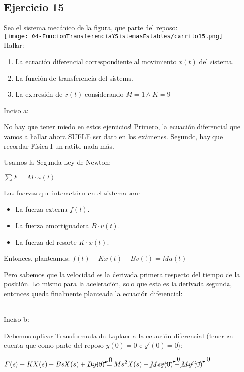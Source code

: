 \documentclass[11pt]{article}
\begin{document}
	\subsection{Ejercicio 15}
	Sea el sistema mecánico de la figura, que parte del reposo:\\
	\texttt{[image: 04-FuncionTransferenciaYSistemasEstables/carrito15.png]}\\
	Hallar:
	\begin{enumerate}[label=(\alph*)]
		\item La ecuación diferencial correspondiente al movimiento $x(t)$ del sistema.
		\item La función de transferencia del sistema.
		\item La expresión de $x(t)$ considerando $M=1 \wedge K=9$
	\end{enumerate}

	Inciso a:
	
	No hay que tener miedo en estos ejercicios! Primero, la ecuación diferencial que vamos a hallar ahora SUELE ser dato en los exámenes. Segundo, hay que recordar Física I un ratito nada más.
	
	Usamos la Segunda Ley de Newton:
	
	$\sum F=M\cdot a(t)$
	
	Las fuerzas que interactúan en el sistema son:
	\begin{itemize}
		\item La fuerza externa $f(t)$.
		\item La fuerza amortiguadora $B\cdot v(t)$.
		\item La fuerza del resorte $K \cdot x(t)$.
	\end{itemize}

	Entonces, planteamos:
	$f(t)-Kx(t)-Bv(t)=Ma(t)$
	
	Pero sabemos que la velocidad es la derivada primera respecto del tiempo de la posición. Lo mismo para la aceleración, solo que esta es la derivada segunda, entonces queda finalmente planteada la ecuación diferencial:
	
	\\
	
	Inciso b:
	
	Debemos aplicar Transformada de Laplace a la ecuación diferencial (tener en cuenta que como parte del reposo $y(0)=0$ e $y'(0)=0$):
	
	$\displaystyle F(s)-KX(s)-BsX(s)+\cancelto{0}{By(0)}=Ms^2X(s)-\cancelto{0}{Msy(0)}-\cancelto{0}{My'(0)}$
	
\end{document}
